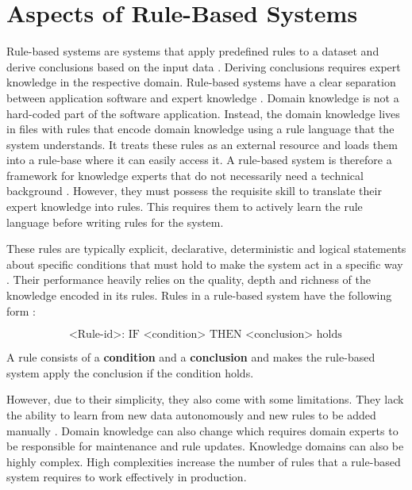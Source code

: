 \chapter{Aspects of Rule-Based Systems}\label{ch:aspects-of-rule-based-systems}
Rule-based systems are systems that apply predefined rules to a dataset and derive conclusions based on the input data \cite{grosan2011rule}.
Deriving conclusions requires expert knowledge in the respective domain.
Rule-based systems have a clear separation between application software and expert knowledge \cite{abdullah2017performance}.
Domain knowledge is not a hard-coded part of the software application.
Instead, the domain knowledge lives in files with rules that encode domain knowledge using a rule language that the system understands.
It treats these rules as an external resource and loads them into a rule-base where it can easily access it.
A rule-based system is therefore a framework for knowledge experts that do not necessarily need a technical background \cite{masri2019survey}.
However, they must possess the requisite skill to translate their expert knowledge into rules.
This requires them to actively learn the rule language before writing rules for the system.

These rules are typically explicit,
declarative, deterministic and logical statements about specific conditions that must hold to make the system act in a specific way \cite{hayes1985rule}.
Their performance heavily relies on the quality, depth and richness of the knowledge encoded in its rules.
Rules in a rule-based system have the following form \cite{hayes1985rule}:

\[
    \text{<Rule-id>}: \text{ IF } \text{<condition>} \text{ THEN } \text{<conclusion>} \text{ holds}
\]

A rule consists of a \textbf{condition} and a \textbf{conclusion}
and makes the rule-based system apply the conclusion if the condition holds.

However, due to their simplicity, they also come with some limitations.
They lack the ability to learn from new data autonomously and new rules to be added manually \cite{oberste2022supporting}.
Domain knowledge can also change which requires domain experts to be responsible for maintenance and rule updates.
Knowledge domains can also be highly complex.
High complexities increase the number of rules that a rule-based system requires to work effectively in production.


